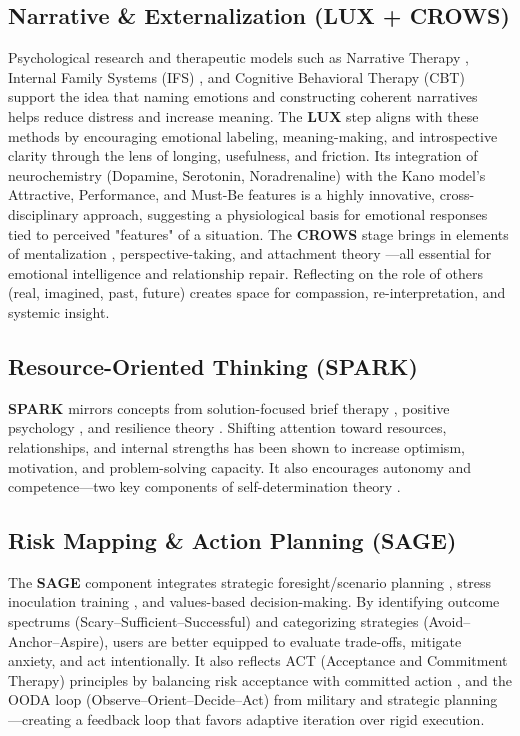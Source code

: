 \documentclass{article}
\begin{document}
\subsection{Narrative \& Externalization (LUX + CROWS)}
Psychological research and therapeutic models such as Narrative Therapy \cite{white1990narrative}, Internal Family Systems (IFS) \cite{schwartz1995internal}, and Cognitive Behavioral Therapy (CBT) \cite{beck1979cognitive} support the idea that naming emotions and constructing coherent narratives helps reduce distress and increase meaning. The \textbf{LUX} step aligns with these methods by encouraging emotional labeling, meaning-making, and introspective clarity through the lens of longing, usefulness, and friction. Its integration of neurochemistry (Dopamine, Serotonin, Noradrenaline) with the Kano model’s Attractive, Performance, and Must-Be features \cite{kano1984attractive} is a highly innovative, cross-disciplinary approach, suggesting a physiological basis for emotional responses tied to perceived "features" of a situation. The \textbf{CROWS} stage brings in elements of mentalization \cite{fonagy2002affect}, perspective-taking, and attachment theory \cite{bowlby1969attachment}—all essential for emotional intelligence and relationship repair. Reflecting on the role of others (real, imagined, past, future) creates space for compassion, re-interpretation, and systemic insight.

\subsection{Resource-Oriented Thinking (SPARK)}
\textbf{SPARK} mirrors concepts from solution-focused brief therapy \cite{de1997building}, positive psychology \cite{seligman2011flourish}, and resilience theory \cite{masten2001ordinary}. Shifting attention toward resources, relationships, and internal strengths has been shown to increase optimism, motivation, and problem-solving capacity. It also encourages autonomy and competence—two key components of self-determination theory \cite{ryan2000self}.

\subsection{Risk Mapping \& Action Planning (SAGE)}
The \textbf{SAGE} component integrates strategic foresight/scenario planning \cite{schoemaker1995scenario}, stress inoculation training \cite{meichenbaum1985stress}, and values-based decision-making. By identifying outcome spectrums (Scary–Sufficient–Successful) and categorizing strategies (Avoid–Anchor–Aspire), users are better equipped to evaluate trade-offs, mitigate anxiety, and act intentionally. It also reflects ACT (Acceptance and Commitment Therapy) principles by balancing risk acceptance with committed action \cite{hayes1999acceptance}, and the OODA loop (Observe–Orient–Decide–Act) from military and strategic planning \cite{boyd1986destruction}—creating a feedback loop that favors adaptive iteration over rigid execution.
\end{document}
